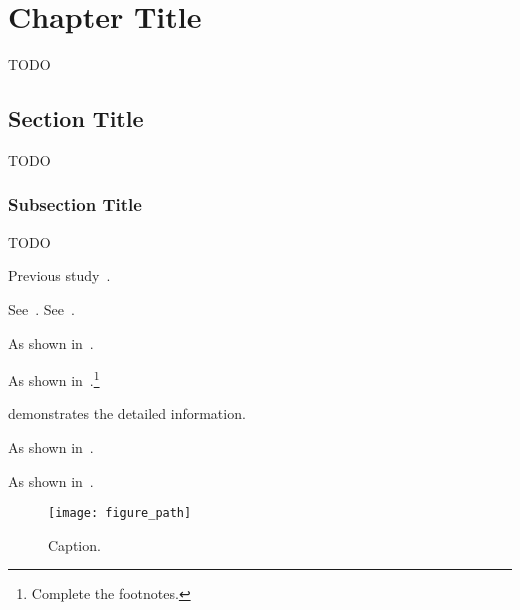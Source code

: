 \chapter{Chapter Title}
\label{ch:template_chapter}
TODO

\section{Section Title}
\label{sec:template_section}
TODO

\subsection{Subsection Title}
\label{sec:template_subsection}
TODO


Previous study~\cite{Cherry_2006_PET}.


See~.
See~.

As shown in~.

As shown in~.\footnote{Complete the footnotes.}

 demonstrates the detailed information.

As shown in~.

As shown in~.



\begin{figure}
    \begin{center}
    \texttt{[image: figure\_path]}
    \end{center}
    \caption{
        Caption.
    }
    \label{fig:template_fig}
\end{figure}


